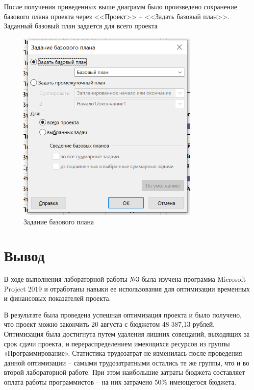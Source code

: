 После получения приведенных выше диаграмм было произведено сохранение базового плана проекта через <<Проект>> -- <<Задать базовый план>>. Заданный базовый план задается для всего проекта

\begin{figure}[H]
    \centering
    \includegraphics[width=0.8\textwidth]{img/content/task_3_finish.png}
    \caption{Задание базового плана}
    \label{fig:task_3_finish}
\end{figure}

\section{Вывод}

В ходе выполнения лабораторной работы №3 была изучена программа Microsoft Project 2019 и отработаны навыки ее использования для оптимизации временных и финансовых показателей проекта.

В результате была проведена успешная оптимизация проекта и было получено, что проект можно закончить 20 августа с бюджетом 48 387,13 рублей. Оптимизация была достигнута путем удаления лишних совещаний, выходящих за срок сдачи проекта, и перераспределением имеющихся ресурсов из группы «Программирование». Статистика трудозатрат не изменилась после проведения данной оптимизации – самыми трудозатратными остались те же группы, что и во второй лабораторной работе. При этом наибольшие затраты бюджета составляет оплата работы программистов -- на них затрачено 50\% имеющегося бюджета.
